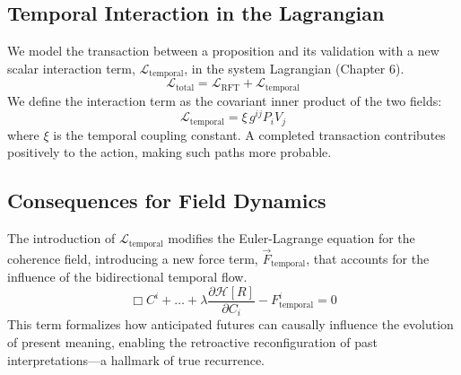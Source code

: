 
\subsection{Temporal Interaction in the Lagrangian}
\label{sec:temporal_interaction_in_the_lagrangian}

We model the transaction between a proposition and its validation with a new scalar interaction term, \(\mathcal{L}_{\text{temporal}}\), in the system Lagrangian (Chapter 6).
\begin{equation}
\mathcal{L}_{\text{total}} = \mathcal{L}_{\text{RFT}} + \mathcal{L}_{\text{temporal}}
\end{equation}
We define the interaction term as the covariant inner product of the two fields:
\begin{equation}
\mathcal{L}_{\text{temporal}} = \xi \, g^{ij} P_{i} V_{j}
\end{equation}
where \(\xi\) is the temporal coupling constant. A completed transaction contributes positively to the action, making such paths more probable.


\subsection{Consequences for Field Dynamics}
\label{sec:consequences_for_field_dynamics}

The introduction of \(\mathcal{L}_{\text{temporal}}\) modifies the Euler-Lagrange equation for the coherence field, introducing a new force term, \(\vec{F}_{\text{temporal}}\), that accounts for the influence of the bidirectional temporal flow.
\begin{equation}
\Box C^i + \dots + \lambda \frac{\partial \mathcal{H}[R]}{\partial C_i} - F^i_{\text{temporal}} = 0
\end{equation}
This term formalizes how anticipated futures can causally influence the evolution of present meaning, enabling the retroactive reconfiguration of past interpretations—a hallmark of true recurrence. 